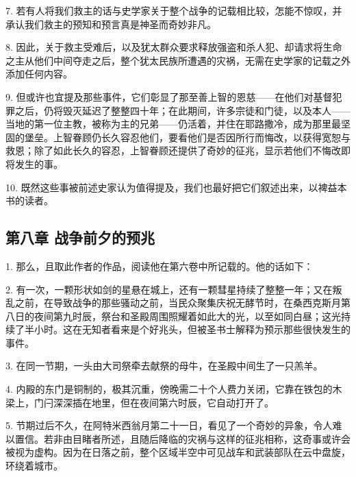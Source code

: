 7. 若有人将我们救主的话与史学家关于整个战争的记载相比较，怎能不惊叹，并承认我们救主的预知和预言真是神圣而奇妙非凡。\par

8. 因此，关于救主受难后，以及犹太群众要求释放强盗和杀人犯、却请求将生命之主从他们中间夺走之后，整个犹太民族所遭遇的灾祸，无需在史学家的记载之外添加任何内容。\par

9. 但或许也宜提及那些事件，它们彰显了那至善上智的恩慈——在他们对基督犯罪之后，仍将毁灭延迟了整整四十年；在此期间，许多宗徒和门徒，以及本人——当地的第一位主教，被称为主的兄弟——仍活着，并住在耶路撒冷，成为那里最坚固的堡垒。上智眷顾仍长久容忍他们，要看他们是否因所行而悔改，以获得宽恕与救恩；除了如此长久的容忍，上智眷顾还提供了奇妙的征兆，显示若他们不悔改即将发生的事。\par

10. 既然这些事被前述史家认为值得提及，我们也最好把它们叙述出来，以裨益本书的读者。\par


\subsection{第八章  战争前夕的预兆}

1. 那么，且取此作者的作品，阅读他在第六卷中所记载的。他的话如下：\par

2. 有一次，一颗形状如剑的星悬在城上，还有一颗彗星持续了整整一年；又在叛乱之前，在导致战争的那些骚动之前，当民众聚集庆祝无酵节时，在桑西克斯月第八日的夜间第九时辰，祭台和圣殿周围照耀着如此大的光，以至如同白昼；这光持续了半小时。这在无知者看来是个好兆头，但被圣书士解释为预示那些很快发生的事件。\par

3. 在同一节期，一头由大司祭牵去献祭的母牛，在圣殿中间生了一只羔羊。\par

4. 内殿的东门是铜制的，极其沉重，傍晚需二十个人费力关闭，它靠在铁包的木梁上，门闩深深插在地里，但在夜间第六时辰，它自动打开了。\par

5. 节期过后不久，在阿特米西翁月第二十一日，看见了一个奇妙的异象，令人难以置信。若非由目睹者所述，且随后降临的灾祸与这样的征兆相称，这奇事或许会被视为虚构。因为在日落之前，整个区域半空中可见战车和武装部队在云中盘旋，环绕着城市。\par

